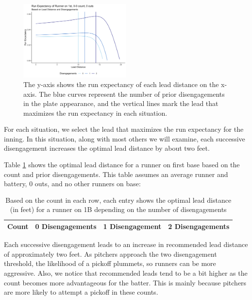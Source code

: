 \documentclass{article}
\begin{document}
        \begin{figure}
          \label{fig:finding-optimal-lead}
          \centering
          \includegraphics[width = 0.5\textwidth]{figures/finding_optimal_lead.png}
          \caption{The y-axis shows the run expectancy of each lead distance on the x-axis. The blue curves represent the number of prior disengagements in the plate appearance, and the vertical lines mark the lead that maximizes the run expectancy in each situation.}
        \end{figure}

        For each situation, we select the lead that maximizes the run expectancy for the inning. In this situation, along with most others we will examine, each successive disengagement increases the optimal lead distance by about two feet.
    
    
        Table \ref{tab:count} shows the optimal lead distance for a runner on first base based on the count and prior disengagements. This table assumes an average runner and battery, 0 outs, and no other runners on base:

        \begin{table}
          \centering
          \begin{tabular}{c|ccc}
            Count & 0 Disengagements & 1 Disengagement & 2 Disengagements\\
            \hline
            
          \end{tabular}
          \caption{Based on the count in each row, each entry shows the optimal lead distance (in feet) for a runner on 1B depending on the number of disengagements}
          \label{tab:count}
        \end{table}

        Each successive disengagement leads to an increase in recommended lead distance of approximately two feet. As pitchers approach the two disengagement threshold, the likelihood of a pickoff plummets, so runners can be more aggressive. Also, we notice that recommended leads tend to be a bit higher as the count becomes more advantageous for the batter. This is mainly because pitchers are more likely to attempt a pickoff in these counts.
\end{document}

